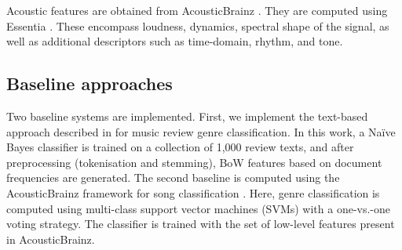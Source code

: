 Acoustic features are obtained from AcousticBrainz \citep{Porter2015}. They are computed using Essentia \citep{bogdanov2013essentia}. These encompass loudness, dynamics, spectral shape of the signal, as well as additional descriptors such as time-domain, rhythm, and tone.%



\subsection{Baseline approaches}
\label{sec:similarity:baselines}
Two baseline systems are implemented. First, we implement the text-based approach described in \cite{Hu2005} for music review genre classification. In this work, a Na\"{i}ve Bayes classifier is trained on a collection of 1,000 review texts, and after preprocessing (tokenisation and stemming), BoW features based on document frequencies are generated.
The second baseline is computed using the AcousticBrainz framework for song classification \cite{Porter2015}. Here, genre classification is computed using  multi-class support vector machines (SVMs) with a one-vs.-one voting strategy. The classifier is trained with the set of low-level features present in AcousticBrainz. %

